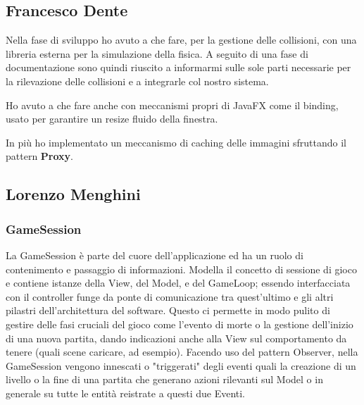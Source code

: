 \documentclass[a4paper,12pt]{report}
\begin{document}
\subsection*{Francesco Dente}
Nella fase di sviluppo ho avuto a che fare, per la gestione delle collisioni, con una libreria esterna per la simulazione della fisica.
A seguito di una fase di documentazione sono quindi riuscito a informarmi sulle sole parti necessarie per la rilevazione delle collisioni e a integrarle col nostro sistema.

Ho avuto a che fare anche con meccanismi propri di JavaFX come il binding, usato per garantire un resize fluido della finestra.

In più ho implementato un meccanismo di caching delle immagini sfruttando il pattern \textbf{Proxy}.

\subsection*{Lorenzo Menghini}

\subsubsection*{GameSession}
La GameSession è parte del cuore dell'applicazione ed ha un ruolo di contenimento e passaggio di informazioni.
Modella il concetto di sessione di gioco e contiene istanze della View, del Model, e del GameLoop; essendo interfacciata con il controller funge da ponte di comunicazione tra quest'ultimo e gli altri pilastri dell'architettura del software. Questo ci permette in modo pulito di gestire delle fasi cruciali del gioco come l'evento di morte o la gestione dell'inizio di una nuova partita, dando indicazioni anche alla View sul comportamento da tenere (quali scene caricare, ad esempio).
Facendo uso del pattern Observer, nella GameSession vengono innescati o "triggerati" degli eventi quali la creazione di un livello o la fine di una partita che generano azioni rilevanti sul Model o in generale su tutte le entità reistrate a questi due Eventi.
\end{document}
